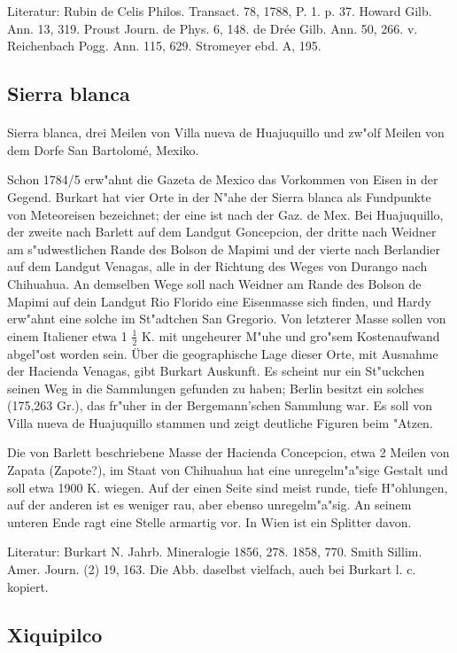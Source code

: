 \documentclass[a4paper, 11pt, oneside]{article}
\begin{document}
Literatur: Rubin de Celis Philos. Transact. 78, 1788, P. 1. p. 37. Howard Gilb. Ann. 13, 319. Proust Journ. de Phys. 6, 148. de Drée Gilb. Ann. 50, 266. v. Reichenbach Pogg. Ann. 115, 629. Stromeyer ebd. A, 195.

\subsection{Sierra blanca}
\normalsize
\paragraph{}
Sierra blanca, drei Meilen von Villa nueva de Huajuquillo und zw"olf Meilen von dem Dorfe San Bartolomé, Mexiko.

Schon 1784/5 erw"ahnt die Gazeta de Mexico das Vorkommen von Eisen in der Gegend. Burkart hat vier Orte in der N"ahe der Sierra blanca als Fundpunkte von Meteoreisen bezeichnet; der eine ist nach der Gaz. de Mex. Bei Huajuquillo, der zweite nach Barlett auf dem Landgut Goncepcion, der dritte nach Weidner am s"udwestlichen Rande des Bolson de Mapimi und der vierte nach Berlandier auf dem Landgut Venagas, alle in der Richtung des Weges von Durango nach Chihuahua. An demselben Wege soll nach Weidner am Rande des Bolson de Mapimi auf dein Landgut Rio Florido eine Eisenmasse sich finden, und Hardy erw"ahnt eine solche im St"adtchen San Gregorio. Von letzterer Masse sollen von einem Italiener etwa 1 $\frac{1}{2}$ K. mit ungeheurer M"uhe und gro"sem Kostenaufwand abgel"ost worden sein. Über die geographische Lage dieser Orte, mit Ausnahme der Hacienda Venagas, gibt Burkart Auskunft. Es scheint nur ein St"uckchen seinen Weg in die Sammlungen gefunden zu haben; Berlin besitzt ein solches (175,263 Gr.), das fr"uher in der Bergemann'schen Sammlung war. Es soll von Villa nueva de Huajuquillo stammen und zeigt deutliche Figuren beim "Atzen.

Die von Barlett beschriebene Masse der Hacienda Concepcion, etwa 2 Meilen von Zapata (Zapote?), im Staat von Chihuahua hat eine unregelm"a"sige Gestalt und soll etwa 1900 K. wiegen. Auf der einen Seite sind meist runde, tiefe H"ohlungen, auf der anderen ist es weniger rau, aber ebenso unregelm"a"sig. An seinem unteren Ende ragt eine Stelle armartig vor. In Wien ist ein Splitter davon.

Literatur: Burkart N. Jahrb. Mineralogie 1856, 278. 1858, 770. Smith Sillim. Amer. Journ. (2) 19, 163. Die Abb. daselbst vielfach, auch bei Burkart l. c. kopiert.

\subsection{Xiquipilco}
\normalsize
\end{document}
